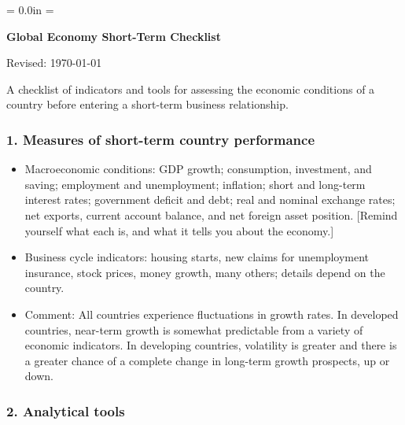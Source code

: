 \documentclass[letterpaper,12pt]{article}
\renewcommand{\labelitemi}{$\Box$}
\def\HeadName{Global Economy Short-Term Checklist}
\begin{document}
\parindent = 0.0in
\parskip = \bigskipamount
\thispagestyle{empty}%
\Head

\centerline{\large \bf \HeadName}%
\centerline{Revised:  \today}

\bigskip
A checklist of indicators and tools for assessing the economic conditions of a country before entering a short-term business relationship.  


\subsubsection*{1. Measures of short-term country performance}

\renewcommand{\labelitemi}{$\Box$}
\begin{itemize}

\item Macroeconomic conditions:  GDP growth; consumption, investment, and saving; employment and unemployment; inflation; short and long-term interest rates; government deficit and debt; real and nominal exchange rates; net exports, current account balance, and net foreign asset position.  [Remind yourself what each is, and what it tells you about the economy.]  

\item Business cycle indicators:  housing starts, new claims for unemployment insurance, stock prices, money growth, many others; details depend on the country.  

\item Comment:  All countries experience fluctuations in growth rates.  
    In developed countries, near-term growth is somewhat predictable 
    from a variety of economic indicators. 
    In developing countries, volatility is greater and there is a greater
    chance of a complete change in long-term growth prospects, up or down.
\end{itemize}     


\subsubsection*{2. Analytical tools}  
\end{document}
